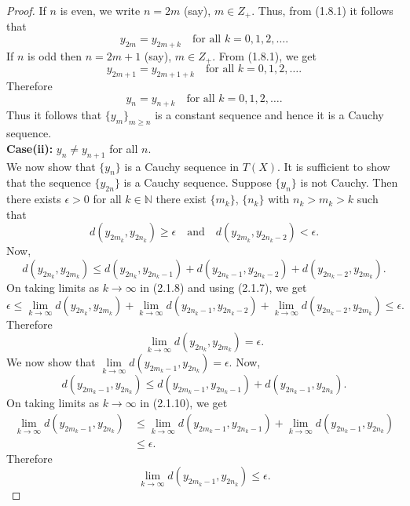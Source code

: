 \documentclass[10pt,a4paper]{amsart}
\begin{document}
\begin{proof}
If $n$ is even, we write $n = 2m$ (say), $m \in Z_+$.
Thus, from (1.8.1) it follows that
\[
y_{2m} = y_{2m+k} \quad \text{for all } k = 0, 1, 2, \ldots.
\]
If $n$ is odd then $n = 2m + 1$ (say), $m \in Z_+$.
From (1.8.1), we get
\[
y_{2m+1} = y_{2m+1+k} \quad \text{for all } k = 0, 1, 2, \ldots.
\]
Therefore
\[
y_n = y_{n+k} \quad \text{for all } k = 0, 1, 2, \ldots.
\]
Thus it follows that $\{y_m\}_{m\geq n}$ is a constant sequence and hence it is a Cauchy sequence.\\
\textbf{Case(ii):}  $y_n \neq y_{n+1}$ for all $n$.\\
We now show that $\{y_n\}$ is a Cauchy sequence in $T(X)$.
It is sufficient to show that the sequence $\{y_{2n}\}$ is a Cauchy sequence.
Suppose $\{y_n\}$ is not Cauchy. Then there exists $\epsilon > 0$ for all $k \in \mathbb{N}$ there exist $\{m_k\}$, $\{n_k\}$ with $n_k > m_k > k$ such that
\begin{equation}
d(y_{2m_k}, y_{2n_k}) \geq \epsilon \quad \text{and} \quad d(y_{2m_k}, y_{2n_k-2}) < \epsilon.
\end{equation}
Now,
\begin{equation}
d(y_{2n_k}, y_{2m_k}) \leq d(y_{2n_k}, y_{2n_k-1}) + d(y_{2n_k-1}, y_{2n_k-2}) + d(y_{2n_k-2}, y_{2m_k}).
\end{equation}
On taking limits as $k \to \infty$ in (2.1.8) and using (2.1.7), we get
\[
\epsilon \leq \lim_{k\to\infty}d(y_{2n_k}, y_{2m_k}) + \lim_{k\to\infty}d(y_{2n_k-1}, y_{2n_k-2}) + \lim_{k\to\infty}d(y_{2n_k-2}, y_{2m_k}) \leq \epsilon.
\]
Therefore
\begin{equation}
\lim_{k\to\infty}d(y_{2n_k}, y_{2m_k}) = \epsilon.
\end{equation}
We now show that $\lim\limits_{k\to\infty}d(y_{2m_k-1}, y_{2n_k}) = \epsilon$.
Now,
\begin{equation}
d(y_{2m_k-1}, y_{2n_k}) \leq d(y_{2m_k-1}, y_{2n_k-1}) + d(y_{2n_k-1}, y_{2n_k}).
\end{equation}
On taking limits as $k\to\infty$ in (2.1.10), we get
\begin{align*}
\lim_{k\to\infty}d(y_{2m_{k}-1},y_{2n_{k}}) &\leq \lim_{k\to\infty}d(y_{2m_{k}-1},y_{2n_{k}-1})+\lim_{k\to\infty}d(y_{2n_{k}-1},y_{2n_{k}}) \\
&\leq \epsilon.
\end{align*}
Therefore
\begin{equation}
\lim_{k\to\infty}d(y_{2m_{k}-1},y_{2n_{k}}) \leq \epsilon.
\end{equation}

\end{proof}
\end{document}
